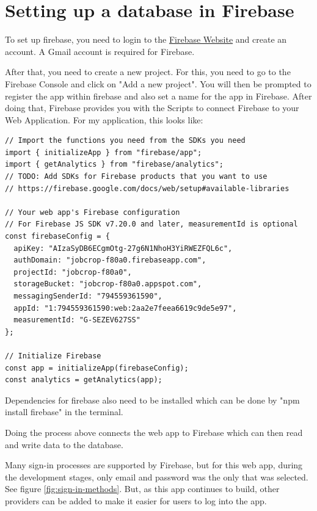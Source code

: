 
\chapter{Setting up a database in Firebase}
\label{AppendixA}

To set up firebase, you need to login to the \href{http://firebase.google.com}{Firebase Website} and create an account. A Gmail account is required for Firebase. 

After that, you need to create a new project. For this, you need to go to the Firebase Console and click on "Add a new project". You will then be prompted to register the app within firebase and also set a name for the app in Firebase. After doing that, Firebase provides you with the Scripts to connect Firebase to your Web Application. For my application, this looks like:

\begin{lstlisting}
// Import the functions you need from the SDKs you need
import { initializeApp } from "firebase/app";
import { getAnalytics } from "firebase/analytics";
// TODO: Add SDKs for Firebase products that you want to use
// https://firebase.google.com/docs/web/setup#available-libraries

// Your web app's Firebase configuration
// For Firebase JS SDK v7.20.0 and later, measurementId is optional
const firebaseConfig = {
  apiKey: "AIzaSyDB6ECgmOtg-27g6N1NhoH3YiRWEZFQL6c",
  authDomain: "jobcrop-f80a0.firebaseapp.com",
  projectId: "jobcrop-f80a0",
  storageBucket: "jobcrop-f80a0.appspot.com",
  messagingSenderId: "794559361590",
  appId: "1:794559361590:web:2aa2e7feea6619c9de5e97",
  measurementId: "G-SEZEV627SS"
};

// Initialize Firebase
const app = initializeApp(firebaseConfig);
const analytics = getAnalytics(app);
\end{lstlisting}

Dependencies for firebase also need to be installed which can be done by "npm install firebase" in the terminal. 

Doing the process above connects the web app to Firebase which can then read and write data to the database. 

Many sign-in processes are supported by Firebase, but for this web app, during the development stages, only email and password was the only that was selected. See figure \ref{fig:sign-in-methods}. But, as this app continues to build, other providers can be added to make it easier for users to log into the app.

